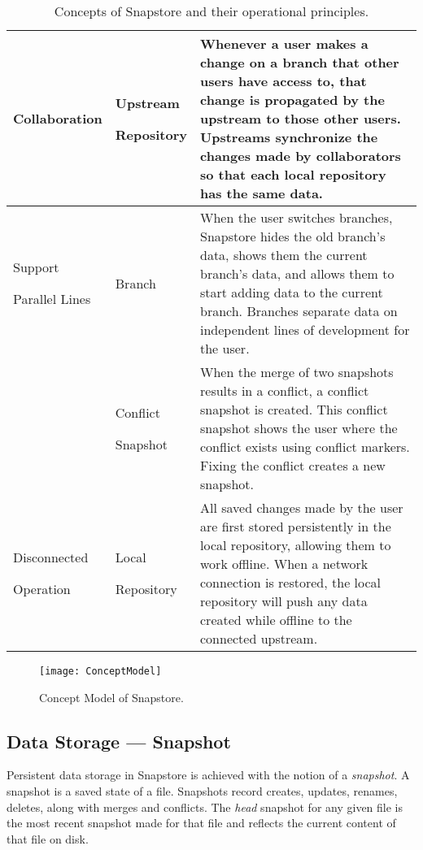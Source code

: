 \begin{table}
\begin{tabular}{ |p{2.25cm}||p{2.25cm}||p{12.5cm}|}
 \hline
 Collaboration & \parbox[t]{3cm}{Upstream \par Repository\strut} & Whenever a user makes a change on a branch that other users have access to, that change is propagated by the upstream to those other users. Upstreams synchronize the changes made by collaborators so that each local repository has the same data.\\[8pt]
 \hline
 \parbox[t]{3cm}{Support \par Parallel Lines\strut} & Branch & When the user switches branches, Snapstore hides the old branch's data, shows them the current branch's data, and allows them to start adding data to the current branch. Branches separate data on independent lines of development for the user.\\[8pt]
  & \parbox[t]{3cm}{Conflict \par Snapshot\strut} & When the merge of two snapshots results in a conflict, a conflict snapshot is created. This conflict snapshot shows the user where the conflict exists using conflict markers. Fixing the conflict creates a new snapshot.\\[8pt]
 \hline
 \parbox[t]{3cm}{Disconnected \par Operation\strut} & \parbox[t]{3cm}{Local \par Repository\strut} & All saved changes made by the user are first stored persistently in the local repository, allowing them to work offline. When a network connection is restored, the local repository will push any data created while offline to the connected upstream.\\[8pt]
 \hline
\end{tabular}
\caption{Concepts of Snapstore and their operational principles.}
\end{table}


\begin{figure}
\texttt{[image: ConceptModel]}
\caption{Concept Model of Snapstore.}
\label{arm:fig1}
\end{figure}

\subsection{Data Storage --- Snapshot}

Persistent data storage in Snapstore is achieved with the notion of a \textit{snapshot}. A snapshot is a saved state of a file. Snapshots record creates, updates, renames, deletes, along with merges and conflicts. The \textit{head} snapshot for any given file is the most recent snapshot made for that file and reflects the current content of that file on disk. 

